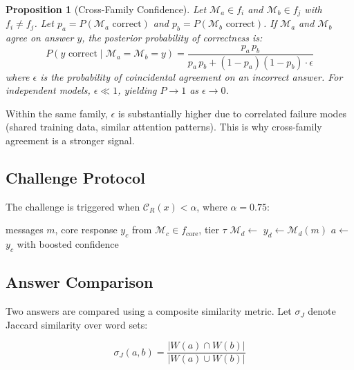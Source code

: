 \documentclass[11pt, a4paper, twocolumn]{article}
\newcommand{\conf}{\mathcal{C}}
\newcommand{\model}{\mathcal{M}}
\newtheorem{proposition}{Proposition}
\begin{document}
\begin{proposition}[Cross-Family Confidence]
Let $\model_a \in f_i$ and $\model_b \in f_j$ with $f_i \neq f_j$. Let $p_a = P(\model_a \text{ correct})$ and $p_b = P(\model_b \text{ correct})$. If $\model_a$ and $\model_b$ agree on answer $y$, the posterior probability of correctness is:
\begin{equation}
    P(y \text{ correct} \mid \model_a = \model_b = y) = \frac{p_a \, p_b}{p_a \, p_b + (1 - p_a)(1 - p_b) \cdot \epsilon}
\end{equation}
where $\epsilon$ is the probability of coincidental agreement on an incorrect answer. For independent models, $\epsilon \ll 1$, yielding $P \to 1$ as $\epsilon \to 0$.
\end{proposition}

Within the same family, $\epsilon$ is substantially higher due to correlated failure modes (shared training data, similar attention patterns). This is why cross-family agreement is a stronger signal.

\subsection{Challenge Protocol}

The challenge is triggered when $\conf_R(x) < \alpha$, where $\alpha = 0.75$:

\begin{algorithm}[H]
\caption{Cross-Family Challenge}
\begin{algorithmic}[1]
\Require messages $m$, core response $y_c$ from $\model_c \in f_{\text{core}}$, tier $\tau$
\State $\model_d \gets$  
\State $y_d \gets \model_d(m)$
\State $a \gets$ 
    \State \Return $y_c$ with boosted confidence
\Else
    \State \Return {}
\EndIf
\end{algorithmic}
\end{algorithm}

\subsection{Answer Comparison}

Two answers are compared using a composite similarity metric. Let $\sigma_J$ denote Jaccard similarity over word sets:

\begin{equation}
    \sigma_J(a, b) = \frac{|W(a) \cap W(b)|}{|W(a) \cup W(b)|}
\end{equation}
\end{document}
